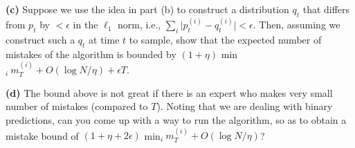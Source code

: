 \documentclass[11pt]{article}
\renewcommand\part[1]{\vspace{.10in}\textbf{(#1)}}
\begin{document}

\part{c}  Suppose we use the idea in part (b) to construct a distribution $q_t$ that differs from $p_t$ by $< \epsilon$ in the $\ell_1$ norm, i.e., 
$\sum_i \vert p_t^{(i)} - q_t^{(i)} \vert < \epsilon$. Then, assuming we construct such a $q_t$ at time $t$ to sample, show that the expected number of mistakes of the algorithm is bounded by $(1 + \eta)$ min$_i \ m_T^{(i)} + O(\log N/\eta) + \epsilon T$.


\part{d} The bound above is not great if there is an expert who makes very small number of mistakes (compared to $T$). Noting that we are dealing with binary predictions, can you come up with a way to run the algorithm, so as to obtain a mistake bound of $(1 + \eta + 2 \epsilon)$ min$_i \ m_T^{(i)} + O(\log N/\eta)$?

\end{document}
